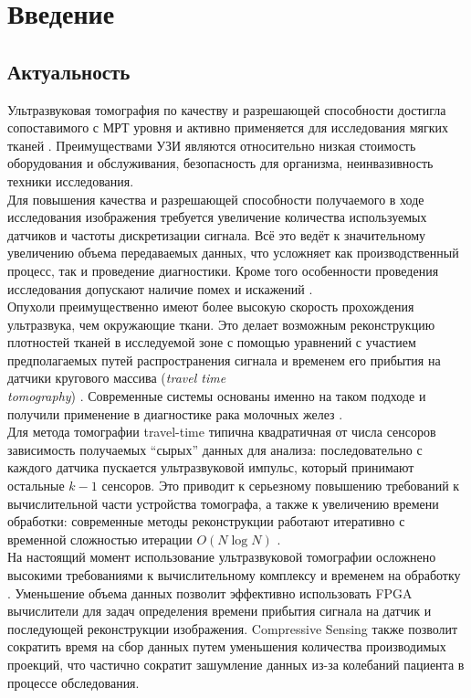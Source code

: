 \documentclass[14pt]{matmex-diploma-custom}
\begin{document}
\section{Введение}

\subsection{Актуальность}
Ультразвуковая томография по качеству и разрешающей способности достигла сопоставимого с МРТ уровня и активно применяется для исследования мягких тканей \cite{hopp2014breast}.
Преимуществами УЗИ являются относительно низкая стоимость оборудования и обслуживания, безопасность для организма, неинвазивность техники исследования. \\

Для повышения качества и разрешающей способности получаемого в ходе исследования изображения требуется увеличение количества используемых датчиков и частоты дискретизации сигнала. Всё это ведёт к значительному увеличению объема передаваемых данных, что усложняет как производственный процесс, так и проведение диагностики. Кроме того особенности проведения исследования допускают наличие помех и искажений \cite{shannon_th}. \\

Опухоли преимущественно имеют более высокую скорость прохождения ультразвука, чем окружающие ткани. Это делает возможным реконструкцию плотностей тканей в исследуемой зоне с помощью уравнений с участием предполагаемых путей распространения сигнала и временем его прибытия на датчики кругового массива (\textit{travel time\\ tomography}) \cite{quan2007sound}. Современные системы основаны именно на таком подходе и получили применение в диагностике рака молочных желез \cite{hormati2010robust}\cite{schreiman1984ultrasound}. \\

Для метода томографии travel-time типична квадратичная от числа сенсоров зависимость получаемых ``сырых'' данных для анализа: последовательно с каждого датчика пускается ультразвуковой импульс, который принимают остальные $k-1$ сенсоров. Это приводит к серьезному повышению требований к вычислительной части устройства томографа, а также к увеличению времени обработки: современные методы реконструкции работают итеративно с временной сложностью итерации $O(N\log N)$ \cite{chen2012compressive}. \\

На настоящий момент использование ультразвуковой томографии осложнено высокими требованиями к вычислительному комплексу и временем на обработку \cite{ozmen2014ultrasound}. Уменьшение объема данных позволит эффективно использовать FPGA вычислители для задач определения времени прибытия сигнала на датчик и последующей реконструкции изображения. Compressive Sensing также позволит сократить время на сбор данных путем уменьшения количества производимых проекций, что частично сократит зашумление данных из-за колебаний пациента в процессе обследования.
\end{document}

